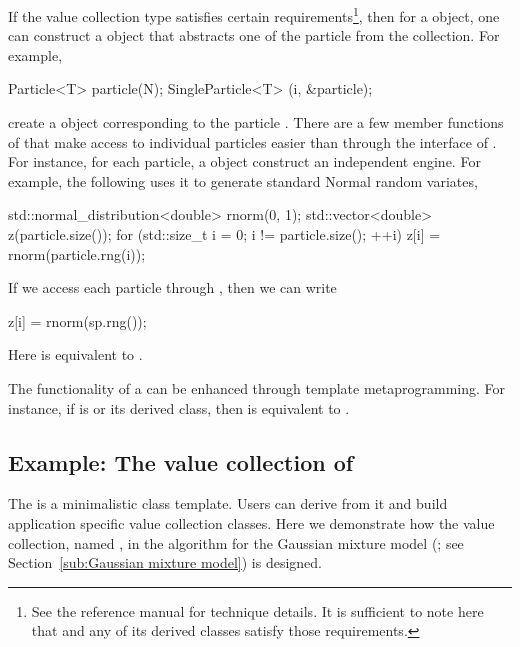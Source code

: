 If the value collection type  satisfies certain
requirements\footnote{See the reference manual for technique details. It is
  sufficient to note here that  and any of its derived
  classes satisfy those requirements.}, then for a 
object, one can construct a  object that
abstracts one of the particle from the collection. For example,
\begin{cppcode}
Particle<T> particle(N);
SingleParticle<T> (i, &particle);
\end{cppcode}
create a  object corresponding to the particle
. There are a few member functions of
 that make access to individual particles easier
than through the interface of . For instance, for each
particle, a  object construct an independent \cppoo{}
\rng engine. For example, the following uses it to generate standard Normal
random variates,
\begin{cppcode}
std::normal_distribution<double> rnorm(0, 1);
std::vector<double> z(particle.size());
for (std::size_t i = 0; i != particle.size(); ++i)
    z[i] = rnorm(particle.rng(i));
\end{cppcode}
If we access each particle through , then we can
write
\begin{cppcode}
z[i] = rnorm(sp.rng());
\end{cppcode}
Here  is equivalent to .

The functionality of a  can be enhanced through
template metaprogramming. For instance, if  is
 or its derived class, then  is
equivalent to .

\subsection{Example: The value collection of \protect\gmm}
\label{sub:Example: The value collection of gmm}

The  is a minimalistic class template. Users can derive
from it and build application specific value collection classes. Here we
demonstrate how the value collection, named , in the \smc[2]
algorithm for the Gaussian mixture model (\gmm; see Section~\ref{sub:Gaussian
  mixture model}) is designed.

